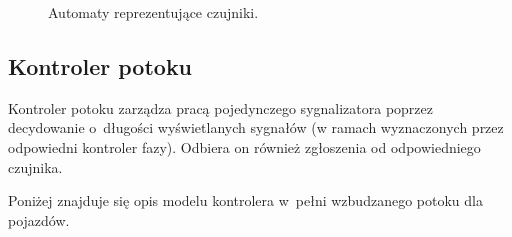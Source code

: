 \documentclass{pracamgr}
\theoremstyle{plain}
\begin{document}
\begin{figure}
  \centering
  \hspace{1cm}
  \caption{Automaty reprezentujące czujniki.}
  \label{img:detectors}
\end{figure}

\subsection{Kontroler potoku}
Kontroler potoku zarządza pracą pojedynczego sygnalizatora poprzez
decydowanie o~długości wyświetlanych sygnałów (w ramach wyznaczonych
przez odpowiedni kontroler fazy). Odbiera on również zgłoszenia od
odpowiedniego czujnika.

Poniżej znajduje się opis modelu kontrolera w~pełni wzbudzanego potoku
dla pojazdów.
\end{document}
